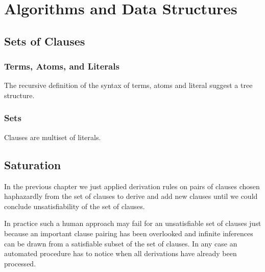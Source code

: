 
\chapter{Algorithms and Data Structures}

\section{Sets of Clauses}

\subsection{Terms, Atoms, and Literals}

The recursive definition of the syntax of terms, atoms and literal suggest a tree structure.



\subsection{Sets}

Clauses are multiset of literals.


\section{Saturation}

In the previous chapter we just applied derivation rules
on pairs of clauses chosen haphazardly from the set of clauses
to derive and add new clauses
until we could conclude unsatisfiability of the set of clauses.

In practice such a human approach may fail for an unsatisfiable set of clauses
just because an important clause pairing has been overlooked
and infinite inferences can be drawn from a satisfiable subset of the set of clauses.
In any case an automated procedure has to notice when all derivations have already been processed.

